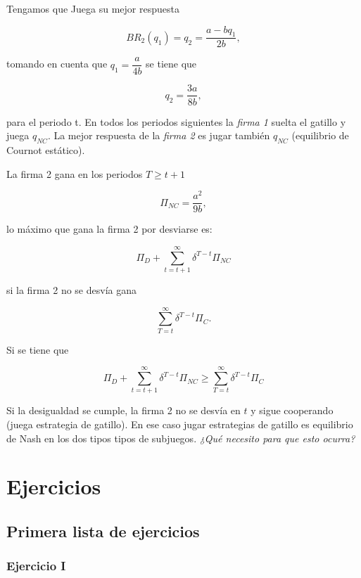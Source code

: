 \documentclass[letterpaper,12pt,twocolumn]{report}
\begin{document}
Tengamos que Juega su mejor respuesta

$$ BR_2(q_1)=q_2=\dfrac{a-bq_1}{2b},$$

tomando en cuenta que $q_1=\dfrac{a}{4b}$ se tiene que 

$$ q_2=\dfrac{3a}{8b},$$

para el periodo t. En todos los periodos siguientes la \textit{firma 1} suelta el gatillo y juega $q_{NC}$. La mejor respuesta de la \textit{firma 2} es jugar también $q_{NC}$ (equilibrio de Cournot estático).

La firma 2 gana en los periodos $T\geq t+1$ 

$$ \Pi_{NC}= \dfrac{a^2}{9b},$$

lo máximo que gana la firma 2 por desviarse es:

$$ \Pi_D + \sum_{t=t+1}^{\infty}\delta^{T-t}\Pi_{NC} $$

si la firma 2 no se desvía gana

$$\sum_{T=t}^{\infty}\delta^{T-t}\Pi_C .$$

Si se tiene que

$$ \Pi_D + \sum_{t=t+1}^{\infty}\delta^{T-t}\Pi_{NC} \geq \sum_{T=t}^{\infty}\delta^{T-t}\Pi_C $$

Si la desigualdad se cumple, la firma 2 no se desvía en $t$ y sigue cooperando (juega estrategia de gatillo). En ese caso jugar estrategias de gatillo es equilibrio de Nash en los dos tipos tipos de subjuegos. \textit{¿Qué necesito para que esto ocurra?}


\chapter{Ejercicios}

\section{Primera lista de ejercicios}

\subsection*{Ejercicio I}
\end{document}
